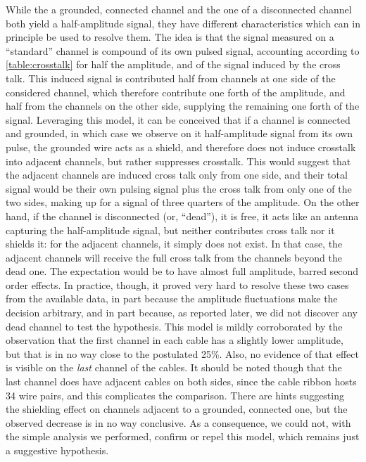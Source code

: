 While the a grounded, connected channel and the one of a disconnected channel
both yield a half-amplitude signal, they have different characteristics which
can in principle be used to resolve them.
The idea is that the signal measured on a ``standard'' channel is compound of
its own pulsed signal, accounting according to \cref{table:crosstalk} for half
the amplitude, and of the signal induced by the cross talk. This induced signal
is contributed half from channels at one side of the considered channel, which
therefore contribute one forth of the amplitude, and half from the channels on
the other side, supplying the remaining one forth of the signal.
Leveraging this model, it can be conceived that if a channel is connected and
grounded, in which case we observe on it half-amplitude signal from its own
pulse, the grounded wire acts as a shield, and therefore does not induce
crosstalk into adjacent channels, but rather suppresses crosstalk. This would
suggest that the adjacent channels are induced cross talk only from one side,
and their total signal would be their own pulsing signal plus the cross talk
from only one of the two sides, making up for a signal of three quarters of the
amplitude. On the other hand, if the channel is disconnected (or, ``dead''),
it is free, it acts like an antenna capturing the half-amplitude signal, but
neither contributes cross talk nor it shields it: for the adjacent channels,
it simply does not exist. In that case, the adjacent channels will receive the
full cross talk from the channels beyond the dead one. The expectation would be
to have almost full amplitude, barred second order effects.
In practice, though, it proved very hard to resolve these two cases from the
available data, in part because the amplitude fluctuations make the decision
arbitrary, and in part because, as reported later, we did not discover any dead
channel to test the hypothesis.
This model is mildly corroborated by the observation that the first channel in
each cable has a slightly lower amplitude, but that is in no way close to the
postulated 25\%. Also, no evidence of that effect is visible on the \emph{last}
channel of the cables. It should be noted though that the last channel does have
adjacent cables on both sides, since the cable ribbon hosts 34 wire pairs, and
this complicates the comparison.
There are hints suggesting the shielding effect on channels adjacent to a
grounded, connected one, but the observed decrease is in no way conclusive.
As a consequence, we could not, with the simple analysis we performed, confirm
or repel this model, which remains just a suggestive hypothesis.



